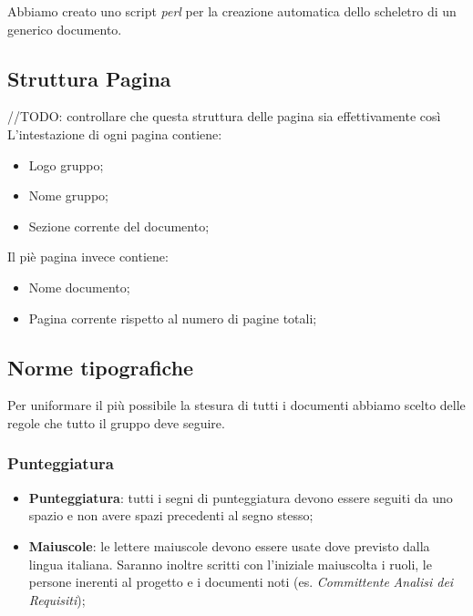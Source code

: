 \documentclass{scalatekids-article}
\begin{document}
Abbiamo creato uno script \textit{perl} per la creazione automatica dello scheletro di un generico documento.

\subsection{Struttura Pagina}
//TODO: controllare che questa struttura delle pagina sia effettivamente così
L'intestazione di ogni pagina contiene:
\begin{itemize}
\item Logo gruppo;
\item Nome gruppo;
\item Sezione corrente del documento;
\end{itemize}
Il piè pagina invece contiene:
\begin{itemize}
\item Nome documento;
\item Pagina corrente rispetto al numero di pagine totali;
\end{itemize}

\subsection{Norme tipografiche}
Per uniformare il più possibile la stesura di tutti i documenti abbiamo scelto delle regole che tutto il gruppo deve seguire.

\subsubsection{Punteggiatura}
\begin{itemize}
\item \textbf{Punteggiatura}: tutti i segni di punteggiatura devono essere seguiti da uno spazio e non avere spazi precedenti al segno stesso;
\item \textbf{Maiuscole}: le lettere maiuscole devono essere usate dove previsto dalla lingua italiana.
  Saranno inoltre scritti con l'iniziale maiuscolta i ruoli, le persone inerenti al progetto e i documenti noti (es. \textit{Committente} \textit{Analisi dei Requisiti});
\end{itemize}
\end{document}
